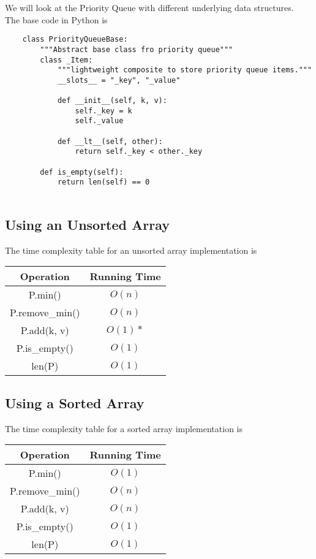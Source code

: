 \documentclass[]{article}
\begin{document}
We will look at the Priority Queue with different underlying data structures.\\

The base code in Python is

\begin{lstlisting}
	class PriorityQueueBase:
		"""Abstract base class fro priority queue"""
		class _Item:
			"""lightweight composite to store priority queue items."""
			__slots__ = "_key", "_value"
			
			def __init__(self, k, v):
				self._key = k
				self._value
				
			def __lt__(self, other):
				return self._key < other._key
		
		def is_empty(self):
			return len(self) == 0
		
\end{lstlisting}\bigbreak


\subsection{Using an Unsorted Array}\bigbreak

The time complexity table for an unsorted array implementation is

\begin{center}
	\begin{table}[h!]\centering
		\begin{tabular}{|c|c|}
			\hline
			Operation   & Running Time\\\hline
			P.min() & $O(n)$\\
			P.remove\_min() & $O(n)$\\
			P.add(k, v) & $O(1)*$\\
			P.is\_empty() & $O(1)$\\
			len(P) & $O(1)$\\\hline
		\end{tabular}
	\end{table}
\end{center}\bigbreak

\subsection{Using a Sorted Array}\bigbreak

The time complexity table for a sorted array implementation is

\begin{center}
	\begin{table}[h!]\centering
		\begin{tabular}{|c|c|}
			\hline
			Operation   & Running Time\\\hline
			P.min() & $O(1)$\\
			P.remove\_min() & $O(n)$\\
			P.add(k, v) & $O(n)$\\
			P.is\_empty() & $O(1)$\\
			len(P) & $O(1)$\\\hline
		\end{tabular}
	\end{table}
\end{center}\bigbreak
\end{document}

